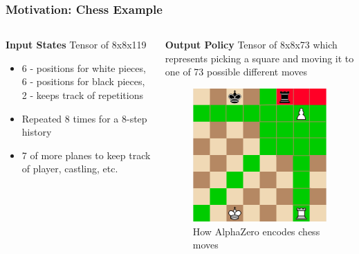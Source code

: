 \documentclass{beamer}
\begin{document}
\begin{frame}
  \frametitle{Motivation: Chess Example}

  \begin{columns}[T]
    \begin{column}{.48\textwidth}
      \textbf{Input States}
      Tensor of 8x8x119
      \begin{itemize}
        \item 6 - positions for white pieces, 6 - positions for black pieces, 2 - keeps track of repetitions
        \item Repeated 8 times for a 8-step history
        \item 7 of more planes to keep track of player, castling, etc.
      \end{itemize}
    \end{column}
    \hfill
    \begin{column}{.48\textwidth}
      \textbf{Output Policy}
      Tensor of 8x8x73 which represents picking a square and moving it to one of 73 possible different moves
      \begin{figure}
        \includegraphics[width=0.5\linewidth]{./images/possible-moves.png}
        \caption{How AlphaZero encodes chess moves}
      \end{figure}
    \end{column}
  \end{columns}
\end{frame}


\end{document}
